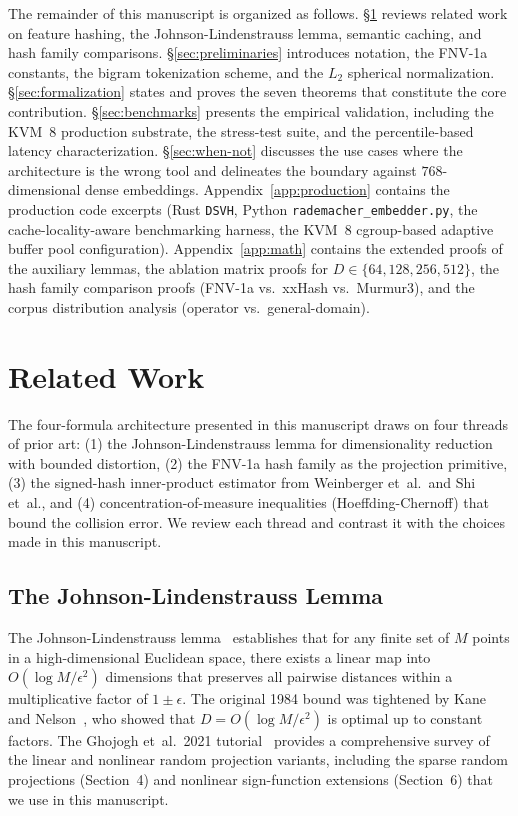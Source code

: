 \documentclass[10pt,twocolumn]{article}
\theoremstyle{definition}
\theoremstyle{remark}
\begin{document}
The remainder of this manuscript is organized as follows.
\S\ref{sec:related} reviews related work on feature hashing, the
Johnson-Lindenstrauss lemma, semantic caching, and hash family
comparisons. \S\ref{sec:preliminaries} introduces notation, the
FNV-1a constants, the bigram tokenization scheme, and the $L_2$
spherical normalization. \S\ref{sec:formalization} states and proves
the seven theorems that constitute the core contribution.
\S\ref{sec:benchmarks} presents the empirical validation, including
the KVM~8 production substrate, the stress-test suite, and the
percentile-based latency characterization. \S\ref{sec:when-not}
discusses the use cases where the architecture is the wrong tool and
delineates the boundary against $768$-dimensional dense embeddings.
Appendix~\ref{app:production} contains the production code excerpts
(Rust \texttt{DSVH}, Python
\texttt{rademacher\_embedder.py}, the cache-locality-aware benchmarking
harness, the KVM~8 cgroup-based adaptive buffer pool configuration).
Appendix~\ref{app:math} contains the extended proofs of the auxiliary
lemmas, the ablation matrix proofs for $D \in \{64, 128, 256, 512\}$, the
hash family comparison proofs (FNV-1a vs.\ xxHash vs.\ Murmur3), and
the corpus distribution analysis (operator vs.\ general-domain).

\section{Related Work}
\label{sec:related}

The four-formula architecture presented in this manuscript draws on four
threads of prior art: (1) the Johnson-Lindenstrauss lemma for dimensionality
reduction with bounded distortion, (2) the FNV-1a hash family as the
projection primitive, (3) the signed-hash inner-product estimator from
Weinberger et~al.\ and Shi et~al., and (4) concentration-of-measure
inequalities (Hoeffding-Chernoff) that bound the collision error. We
review each thread and contrast it with the choices made in this
manuscript.

\subsection{The Johnson-Lindenstrauss Lemma}

The Johnson-Lindenstrauss lemma~\citep{johnson1984extensions} establishes
that for any finite set of $M$ points in a high-dimensional Euclidean
space, there exists a linear map into $O(\log M / \epsilon^2)$ dimensions
that preserves all pairwise distances within a multiplicative factor of
$1 \pm \epsilon$. The original 1984 bound was tightened by Kane and
Nelson~\citep{kane2013jl}, who showed that $D = O(\log M / \epsilon^2)$
is optimal up to constant factors. The Ghojogh et~al.\ 2021
tutorial~\citep{ghojogh2021jl} provides a comprehensive survey of the
linear and nonlinear random projection variants, including the sparse
random projections (Section~4) and nonlinear sign-function extensions
(Section~6) that we use in this manuscript.
\end{document}
